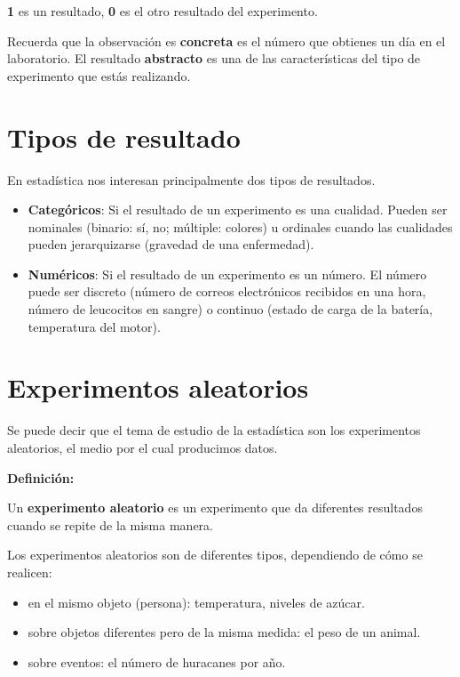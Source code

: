 \documentclass[
]{book}
\providecommand{\tightlist}{%
  \setlength{\itemsep}{0pt}\setlength{\parskip}{0pt}}
\begin{document}
\textbf{1} es un resultado, \textbf{0} es el otro resultado del experimento.

Recuerda que la observación es \textbf{concreta} es el número que obtienes un día en el laboratorio. El resultado \textbf{abstracto} es una de las características del tipo de experimento que estás realizando.

\hypertarget{tipos-de-resultado}{%
\section{Tipos de resultado}\label{tipos-de-resultado}}

En estadística nos interesan principalmente dos tipos de resultados.

\begin{itemize}
\item
  \textbf{Categóricos}: Si el resultado de un experimento es una cualidad. Pueden ser nominales (binario: sí, no; múltiple: colores) u ordinales cuando las cualidades pueden jerarquizarse (gravedad de una enfermedad).
\item
  \textbf{Numéricos}: Si el resultado de un experimento es un número. El número puede ser discreto (número de correos electrónicos recibidos en una hora, número de leucocitos en sangre) o continuo (estado de carga de la batería, temperatura del motor).
\end{itemize}

\hypertarget{experimentos-aleatorios}{%
\section{Experimentos aleatorios}\label{experimentos-aleatorios}}

Se puede decir que el tema de estudio de la estadística son los experimentos aleatorios, el medio por el cual producimos datos.

\textbf{Definición:}

Un \textbf{experimento aleatorio} es un experimento que da diferentes resultados cuando se repite de la misma manera.

Los experimentos aleatorios son de diferentes tipos, dependiendo de cómo se realicen:

\begin{itemize}
\tightlist
\item
  en el mismo objeto (persona): temperatura, niveles de azúcar.
\item
  sobre objetos diferentes pero de la misma medida: el peso de un animal.
\item
  sobre eventos: el número de huracanes por año.
\end{itemize}
\end{document}
